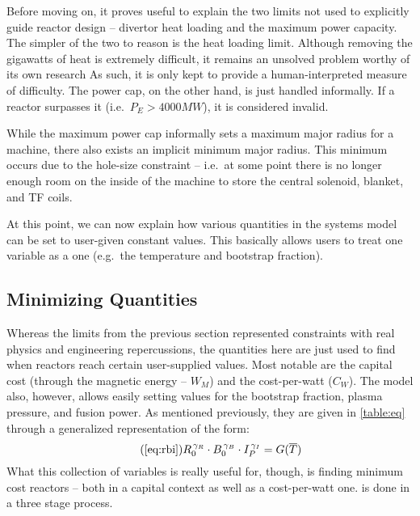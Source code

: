 Before moving on, it proves useful to explain the two limits not used to explicitly guide reactor design -- divertor heat loading and the maximum power capacity. The simpler of the two to reason is the heat loading limit. Although removing the gigawatts of heat is extremely difficult, it remains an unsolved problem worthy of its own research  As such, it is only kept to provide a human-interpreted  measure of difficulty. The power cap, on the other hand, is just handled informally. If a reactor surpasses it (i.e.\ $ P_E > 4000 MW $), it is considered invalid.

While the maximum power cap informally sets a maximum major radius for a machine, there also exists an implicit minimum major radius. This minimum occurs due to the hole-size constraint -- i.e.\ at some point there is no longer enough room on the inside of the machine to store the central solenoid, blanket, and TF coils.

At this point, we can now explain how various quantities in the systems model can be set to user-given constant values. This basically allows users to treat one  variable as a  one (e.g.\ the temperature and bootstrap fraction).

\subsection{Minimizing  Quantities}

Whereas the limits from the previous section represented constraints with real physics and engineering repercussions, the  quantities here are just used to find when reactors reach certain user-supplied values. Most notable are the capital cost (through the magnetic energy -- $W_M$) and the cost-per-watt ($C_W$). The model also, however, allows easily setting values for the bootstrap fraction, plasma pressure, and fusion power. As mentioned previously, they are given in \cref{table:eq} through a generalized representation of the form:
\begin{equation}
	\tag{\ref{eq:rbi}}
	R_0^{\, \gamma_R} \cdot B_0^{\, \gamma_B} \cdot I_P^{\, \gamma_I} = G( \overline T )
\end{equation}
What this collection of variables is really useful for, though, is finding minimum cost reactors -- both in a capital context as well as a cost-per-watt one.  is done in a three stage process. 

